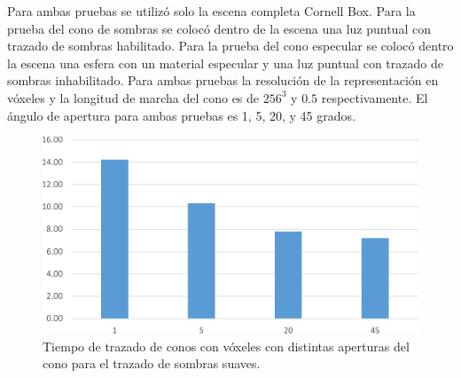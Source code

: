 Para ambas pruebas se utilizó solo la escena completa Cornell Box. Para la prueba del cono de sombras se colocó dentro de la escena una luz puntual con trazado de sombras habilitado. Para la prueba del cono especular se colocó dentro la escena una esfera con un material especular y una luz puntual con trazado de sombras inhabilitado. Para ambas pruebas la resolución de la representación en vóxeles y la longitud de marcha del cono es de $256^3$ y $0.5$ respectivamente. El ángulo de apertura para ambas pruebas es 1, 5, 20, y 45 grados.

\begin{figure}[H]
	\centering
	\includegraphics[width=0.95\linewidth]{media/shadowcone_aperture_cropped.pdf}
	\caption{Tiempo de trazado de conos con vóxeles con distintas aperturas del cono para el trazado de sombras suaves.}
	\label{fig:shadowcone_aperture}
\end{figure}
